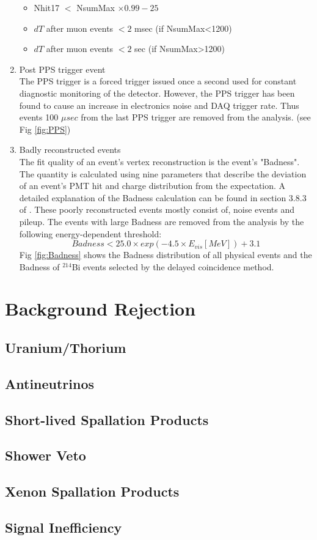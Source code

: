 \begin{enumerate}
	\begin{itemize}
		\item Nhit17 $<$ NsumMax $\times 0.99-25$
		\item $dT$ after muon events $< 2$ msec (if NsumMax<1200)
		\item $dT$ after muon events $< 2$ sec (if NsumMax>1200)
	\end{itemize}
	\item Post PPS trigger event \\
	The PPS trigger is a forced trigger issued once a second used for constant diagnostic monitoring of the detector. However, the PPS trigger has been found to cause an increase in electronics noise and DAQ trigger rate. Thus events 100 $\mu sec$ from the last PPS trigger are removed from the analysis. (see Fig \ref{fig:PPS})
	\item Badly reconstructed events \\
	The fit quality of an event's vertex reconstruction is the event's "Badness". The quantity is calculated using nine parameters that describe the deviation of an event's PMT hit and charge distribution from the expectation. A detailed explanation of the Badness calculation can be found in section 3.8.3 of \cite{}. These poorly reconstructed events mostly consist of, noise events and pileup. The events with large Badness are removed from the analysis by the following energy-dependent threshold:
	\begin{equation}
		Badness < 25.0\times exp(-4.5\times E_{vis} [MeV]) + 3.1
	\end{equation}
	Fig \ref{fig:Badness} shows the Badness distribution of all physical events and the Badness of $^{214}$Bi events selected by the delayed coincidence method.
\end{enumerate}

\section{Background Rejection}
\subsection{Uranium/Thorium}
\subsection{Antineutrinos}
\subsection{Short-lived Spallation Products}
\subsection{Shower Veto}
\subsection{Xenon Spallation Products}
\subsection{Signal Inefficiency}

